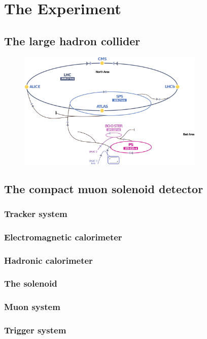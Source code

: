 \chapter{The Experiment}\label{chap:experiment}

\section{The large hadron collider}\label{sec:LHC}



\begin{figure}[hbtp]
 \centering
 \includegraphics[width=0.79\textwidth]{figures/general/LHC}
 \caption{}
 \label{fig:LHC}
\end{figure}


\section{The compact muon solenoid detector}\label{sec:CMS}

\subsection{Tracker system}
\subsection{Electromagnetic calorimeter}
\subsection{Hadronic calorimeter}
\subsection{The solenoid}
\subsection{Muon system}
\subsection{Trigger system}
